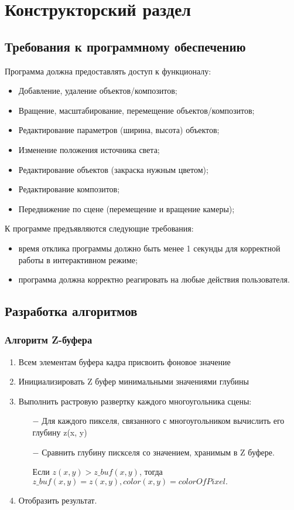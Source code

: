 \section{Конструкторский раздел}
\subsection{Требования к программному обеспечению}
Программа должна предоставлять доступ к функционалу:
\begin{itemize}
    \item Добавление, удаление объектов/композитов;
    \item Вращение, масштабирование, перемещение объектов/композитов;
    \item Редактирование параметров (ширина, высота) объектов;
    \item Изменение положения источника света;
    \item Редактирование объектов (закраска нужным цветом);
    \item Редактирование композитов;
    \item Передвижение по сцене (перемещение и вращение камеры);
\end{itemize}

К программе предъявляются следующие требования:

\begin{itemize}
    \item время отклика программы должно быть менее 1 секунды для корректной работы в интерактивном режиме;
    \item программа должна корректно реагировать на любые действия пользователя.
\end{itemize}

\subsection{Разработка алгоритмов}

\subsubsection{Алгоритм Z-буфера}
\begin{enumerate}
    \item Всем элементам буфера кадра присвоить фоновое значение
    \item Инициализировать Z буфер минимальными значениями глубины
    \item Выполнить растровую развертку каждого многоугольника сцены:
    \begin{itemize}
        \item[$-$] Для каждого пикселя, связанного с многоугольником вычислить его
        глубину z(x, y)
        \item[$-$] Сравнить глубину пискселя со значением, хранимым в Z буфере.

            Если \(z(x, y) > z\_buf(x, y) \), тогда\newline
            \(z\_buf(x,y) = z(x,y), color(x, y) = colorOfPixel.\)
    \end{itemize}
    \item Отобразить результат.
\end{enumerate}

